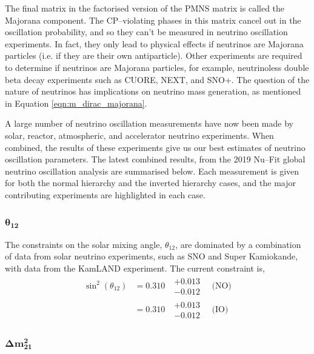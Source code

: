 The final matrix in the factorised version of the PMNS matrix is called the 
Majorana component. The CP--violating phases in this matrix cancel out in the 
oscillation probability, and so they can't be measured in neutrino oscillation 
experiments. In fact, they only lead to physical effects if neutrinos are 
Majorana particles (i.e. if they are their own antiparticle). Other experiments 
are required to determine if neutrinos are Majorana particles, for example, 
neutrinoless double beta decay experiments such as CUORE\cite{Arnaboldi2004}, 
NEXT\cite{Alvarez2012}, and SNO+\cite{Andringa2016}. The question of the 
nature of neutrinos has implications on neutrino mass generation, as mentioned 
in Equation \ref{eqn:m_dirac_majorana}.

A large number of neutrino oscillation measurements have now been made by
solar, reactor, atmospheric, and accelerator neutrino experiments. When
combined, the results of these experiments give us our best estimates of 
neutrino oscillation parameters. The latest combined results, from the 2019 
Nu--Fit global neutrino oscillation analysis\cite{Esteban:2018azc} are 
summarised below. Each measurement is given for both the normal hierarchy and 
the inverted hierarchy cases, and the major contributing experiments are
highlighted in each case.

\subsubsection*{$\boldsymbol{\theta_{12}}$}

The constraints on the solar mixing angle, $\theta_{12}$, are dominated by a
combination of data from solar neutrino experiments, such as SNO\cite{Ahmad2002}
and Super Kamiokande\cite{PhysRevLett.86.5651}, with data from the KamLAND 
experiment\cite{Araki2005}. The current constraint is,
\begin{align*}
	\sin^2(\theta_{12}) &= 0.310 \mbox{ } \substack{+ 0.013 \\ - 0.012} \quad \mbox{(NO)} \\
	                    &= 0.310 \mbox{ } \substack{+ 0.013 \\ - 0.012} \quad \mbox{(IO)}
\end{align*}

\subsubsection*{$\boldsymbol{\Delta m^2_{21}}$}

